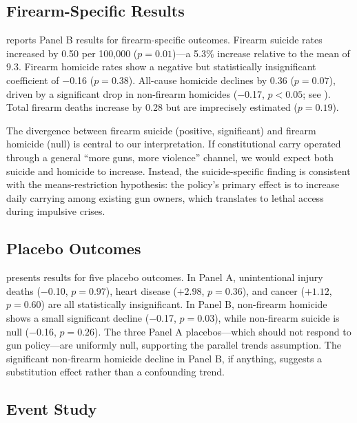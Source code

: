 \documentclass[12pt]{article}
\begin{document}


\subsection{Firearm-Specific Results}

 reports Panel B results for firearm-specific outcomes. Firearm suicide rates increased by 0.50 per 100,000 ($p = 0.01$)---a 5.3\% increase relative to the mean of 9.3. Firearm homicide rates show a negative but statistically insignificant coefficient of $-$0.16 ($p = 0.38$). All-cause homicide declines by 0.36 ($p = 0.07$), driven by a significant drop in non-firearm homicides ($-$0.17, $p < 0.05$; see ). Total firearm deaths increase by 0.28 but are imprecisely estimated ($p = 0.19$).

The divergence between firearm suicide (positive, significant) and firearm homicide (null) is central to our interpretation. If constitutional carry operated through a general ``more guns, more violence'' channel, we would expect both suicide and homicide to increase. Instead, the suicide-specific finding is consistent with the means-restriction hypothesis: the policy's primary effect is to increase daily carrying among existing gun owners, which translates to lethal access during impulsive crises.



\subsection{Placebo Outcomes}

 presents results for five placebo outcomes. In Panel A, unintentional injury deaths ($-$0.10, $p = 0.97$), heart disease ($+2.98$, $p = 0.36$), and cancer ($+1.12$, $p = 0.60$) are all statistically insignificant. In Panel B, non-firearm homicide shows a small significant decline ($-$0.17, $p = 0.03$), while non-firearm suicide is null ($-$0.16, $p = 0.26$). The three Panel A placebos---which should not respond to gun policy---are uniformly null, supporting the parallel trends assumption. The significant non-firearm homicide decline in Panel B, if anything, suggests a substitution effect rather than a confounding trend.



\subsection{Event Study}
\end{document}

